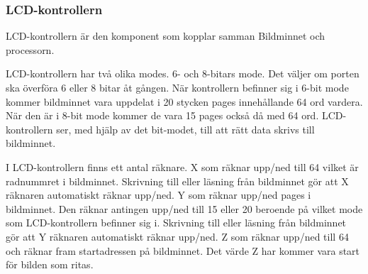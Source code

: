 \documentclass[main.tex]{subfiles}
\begin{document}
\subsubsection{LCD-kontrollern}

LCD-kontrollern är den komponent som kopplar samman Bildminnet och processorn.

LCD-kontrollern har två olika modes. 6- och 8-bitars mode. Det väljer om porten ska överföra 6 eller 8 bitar åt gången. När kontrollern befinner sig i 6-bit mode kommer bildminnet vara uppdelat i 20 stycken pages innehållande 64 ord vardera. När den är i 8-bit mode kommer de vara 15 pages också då med 64 ord. LCD-kontrollern ser, med hjälp av det bit-modet, till att rätt data skrivs till bildminnet.

I LCD-kontrollern finns ett antal räknare. 
X som räknar upp/ned till 64 vilket är radnummret i bildminnet. Skrivning till eller läsning från bildminnet gör att X räknaren automatiskt räknar upp/ned.
Y som räknar upp/ned pages i bildminnet. Den räknar antingen upp/ned till 15 eller 20 beroende på vilket mode som LCD-kontrollern befinner sig i. Skrivning till eller läsning från bildminnet gör att Y räknaren automatiskt räknar upp/ned.
Z som räknar upp/ned till 64 och räknar fram startadressen på bildminnet. Det värde Z har kommer vara start för bilden som ritas.
\end{document}
